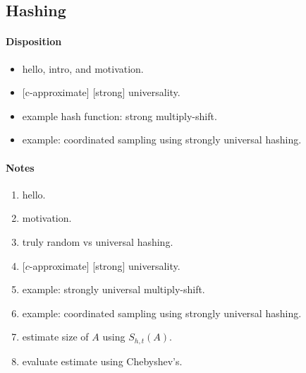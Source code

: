 \newpage

\subsection{Hashing}

\paragraph{Disposition}
\begin{itemize}
  \item hello, intro, and motivation.
  \item {}[c-approximate] [strong] universality.
  \item example hash function: strong multiply-shift.
  \item example: coordinated sampling using strongly universal hashing.
\end{itemize}

\paragraph{Notes}

\begin{enumerate}
  \item hello.
  \item motivation.
  \item truly random vs universal hashing.
  \item {}[$c$-approximate] [strong] universality.\\

  \item example: strongly universal multiply-shift.
  \item example: coordinated sampling using strongly universal hashing.\\

  \item estimate size of $A$ using $S_{h, t}(A)$.
  \item evaluate estimate using Chebyshev's.
\end{enumerate}
